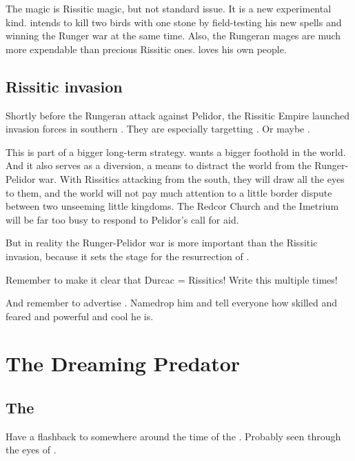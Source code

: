 The \EreshKali{} magic is Rissitic magic, but not standard issue. 
It is a new experimental kind. 
\Secherdamon{} intends to kill two birds with one stone by field-testing his new spells and winning the Runger war at the same time. 
Also, the Rungeran mages are much more expendable than precious Rissitic ones. 
\Secherdamon{} loves his own people. 









\subsection{Rissitic invasion}
Shortly before the Rungeran attack against Pelidor, the Rissitic Empire launched invasion forces in southern \Galessan. 
They are especially targetting . 
Or maybe \Scyrum. 

This is part of a bigger long-term strategy. 
\Secherdamon{} wants a bigger foothold in the world. 
And it also serves as a diversion, a means to distract the world from the Runger-Pelidor war. 
With Rissitics attacking from the south, they will draw all the eyes to them, and the world will not pay much attention to a little border dispute between two unseeming little kingdoms. 
The Redcor Church and the Imetrium will be far too busy to respond to Pelidor's call for aid. 

But in reality the Runger-Pelidor war is more important than the Rissitic invasion, because it sets the stage for the resurrection of \Nithdornazsh. 

Remember to make it clear that Durcac = Rissitics! 
Write this multiple times! 

And remember to advertise . 
Namedrop him and tell everyone how skilled and feared and powerful and cool he is. 
















\section{The Dreaming Predator}
\subsection{The \SecondShrouding}
Have a flashback to somewhere around the time of the . 
Probably seen through the eyes of \Nzessuacrith. 

